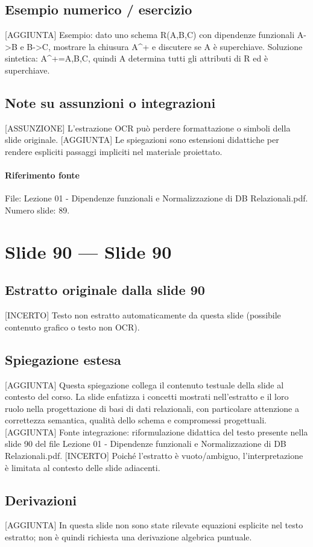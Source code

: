 \documentclass[11pt]{article}
\begin{document}
\subsection*{Esempio numerico / esercizio}
[AGGIUNTA] Esempio: dato uno schema R(A,B,C) con dipendenze funzionali A->B e B->C, mostrare la chiusura A^+ e discutere se A è superchiave. Soluzione sintetica: A^+={A,B,C}, quindi A determina tutti gli attributi di R ed è superchiave.
\subsection*{Note su assunzioni o integrazioni}
[ASSUNZIONE] L'estrazione OCR può perdere formattazione o simboli della slide originale.
[AGGIUNTA] Le spiegazioni sono estensioni didattiche per rendere espliciti passaggi impliciti nel materiale proiettato.
\paragraph{Riferimento fonte} File: Lezione 01 - Dipendenze funzionali e Normalizzazione di DB Relazionali.pdf. Numero slide: 89.
\section{Slide 90 --- Slide 90}
\subsection*{Estratto originale dalla slide 90}
[INCERTO] Testo non estratto automaticamente da questa slide (possibile contenuto grafico o testo non OCR).
\subsection*{Spiegazione estesa}
[AGGIUNTA] Questa spiegazione collega il contenuto testuale della slide al contesto del corso. La slide enfatizza i concetti mostrati nell'estratto e il loro ruolo nella progettazione di basi di dati relazionali, con particolare attenzione a correttezza semantica, qualità dello schema e compromessi progettuali.
[AGGIUNTA] Fonte integrazione: riformulazione didattica del testo presente nella slide 90 del file Lezione 01 - Dipendenze funzionali e Normalizzazione di DB Relazionali.pdf.
[INCERTO] Poiché l'estratto è vuoto/ambiguo, l'interpretazione è limitata al contesto delle slide adiacenti.
\subsection*{Derivazioni}
[AGGIUNTA] In questa slide non sono state rilevate equazioni esplicite nel testo estratto; non è quindi richiesta una derivazione algebrica puntuale.
\end{document}

